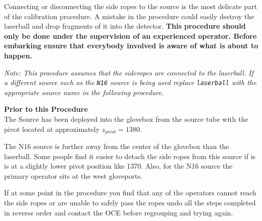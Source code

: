  
  Connecting or disconnecting the side ropes to the source is the most
delicate part of the calibration procedure.  A mistake
in the procedure could easily destroy the laserball and
drop fragments of it into the detector.  
{\bf
This procedure should only be done under the supervision of
an experienced operator. Before embarking ensure that everybody involved
is aware of what is about to happen. 
}
 
\noindent
{\em Note:  This procedure assumes that  the sideropes are connected 
  to the laserball.  If a different source such as the {\tt N16} source
  is being used replace {\tt laserball} with the appropriate source
  name in  the  following procedure.
}
  
\vspace*{0.25in}
\noindent
{\bf Prior to this Procedure}\\
The Source has been deployed into the glovebox from the source
tube with the pivot located at approximately $z_{pivot} = 1380$.

  The N16 source is further away from the center of the glovebox
than the laserball. Some people find it easier to detach the side ropes
from this source if is is at a slightly lower pivot position like
1370. Also, for the N16 source the primary operator sits at the west
gloveports.

  If at some point in the procedure you find that any of
the operators cannot reach the side ropes or are unable to safely
pass the ropes undo all the steps completed in reverse order and contact
the OCE before regrouping and trying again.


